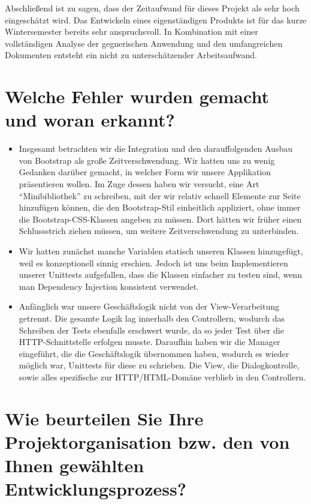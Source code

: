 \documentclass[12pt,DIV14,BCOR10mm,a4paper,parskip=half-,headsepline,headinclude,english,ngerman,bibliography=totocnumbered]{scrreprt}
\begin{document}
Abschließend ist zu sagen, dass der Zeitaufwand für dieses Projekt als sehr hoch eingeschätzt wird.
Das Entwickeln eines eigenständigen Produkts ist für das kurze Wintersemester bereits sehr anspruchsvoll. In Kombination mit einer vollständigen Analyse der gegnerischen Anwendung und den umfangreichen Dokumenten entsteht ein nicht zu unterschätzender Arbeitsaufwand.

\section{Welche Fehler wurden gemacht und woran erkannt?}

\begin{itemize}
  \item Insgesamt betrachten wir die Integration und den darauffolgenden Ausbau von Bootstrap als große Zeitverschwendung. Wir hatten uns zu wenig Gedanken darüber gemacht, in welcher Form wir unsere Applikation präsentieren wollen. Im Zuge dessen haben wir versucht, eine Art \enquote{Minibibliothek} zu schreiben, mit der wir relativ schnell Elemente zur Seite hinzufügen können, die den Bootstrap-Stil einheitlich appliziert, ohne immer die Bootstrap-CSS-Klassen angeben zu müssen. Dort hätten wir früher einen Schlussstrich ziehen müssen, um weitere Zeitverschwendung zu unterbinden.
  \item Wir hatten zunächst manche Variablen statisch unseren Klassen hinzugefügt, weil es konzeptionell sinnig erschien. Jedoch ist uns beim Implementieren unserer Unittests aufgefallen, dass die Klassen einfacher zu testen sind, wenn man Dependency Injection konsistent verwendet.
  \item Anfänglich war unsere Geschäftslogik nicht von der View-Verarbeitung getrennt. Die gesamte Logik lag innerhalb den Controllern, wodurch das Schreiben der Tests ebenfalls erschwert wurde, da so jeder Test über die HTTP-Schnittstelle erfolgen musste. Daraufhin haben wir die Manager eingeführt, die die Geschäftslogik übernommen haben, wodurch es wieder möglich war, Unittests für diese zu schrieben. Die View, die Dialogkontrolle, sowie alles spezifische zur HTTP/HTML-Domäne verblieb in den Controllern.
\end{itemize}

\section{Wie beurteilen Sie Ihre Projektorganisation bzw. den von Ihnen gewählten Entwicklungsprozess?}
\end{document}

